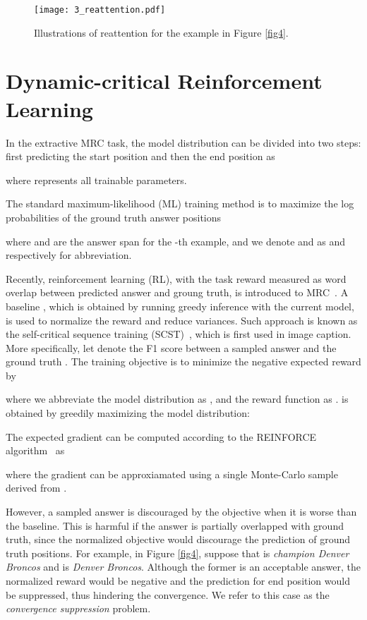 \documentclass{article}
\begin{document}
\begin{figure}
\begin{center}
\texttt{[image: 3\_reattention.pdf]}
\end{center}
\caption{Illustrations of reattention for the example in Figure \ref{fig4}.}
\label{fig5}
\end{figure}
 \section{Dynamic-critical Reinforcement Learning}
In the extractive MRC task, the model distribution  can be divided into two steps: first predicting the start position  and then the end position  as

where  represents all trainable parameters.

The standard maximum-likelihood (ML) training method is to maximize the log probabilities of the ground truth answer positions~\cite{Wang17a}

where  and  are the answer span for the -th example, and we denote  and  as  and  respectively for abbreviation.

Recently, reinforcement learning (RL), with the task reward measured as word overlap between predicted answer and groung truth, is introduced to MRC~\cite{Xiong17}.
A baseline , which is obtained by running greedy inference with the current model, is used to normalize the reward and reduce variances. Such approach is known as the self-critical sequence training (SCST)~\cite{Rennie2016}, which is first used in image caption. 
More specifically, let  denote the F1 score between a sampled answer  and the ground truth . 
The training objective is to minimize the negative expected reward by

where we abbreviate the model distribution  as , and the reward function  as . 
 is obtained by greedily maximizing the model distribution: 


The expected gradient  can be computed according to the REINFORCE algorithm~\cite{Sutton98} as

where the gradient can be approxiamated using a single Monte-Carlo sample  derived from .

However, a sampled answer is discouraged by the objective when it is worse than the baseline. 
This is harmful if the answer is partially overlapped with ground truth, since the normalized objective would discourage the prediction of ground truth positions.
For example, in Figure \ref{fig4}, suppose that  is \emph{champion Denver Broncos} and  is \emph{Denver Broncos}. Although the former is an acceptable answer, the normalized reward would be negative and the prediction for end position would be suppressed, thus hindering the convergence. 
We refer to this case as the \emph{convergence suppression} problem.
\end{document}
